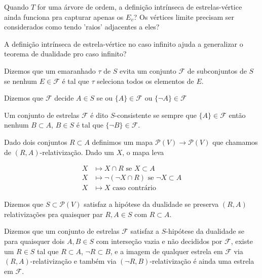 \begin{pergunta}
Quando $T$ for uma árvore de ordem, a definição intrínseca de estrelas-vértice ainda funciona pra capturar apenas os $E_v$? Os vértices limite precisam ser considerados como tendo 'raios' adjacentes a eles?
\end{pergunta}

\begin{pergunta}
 A definição intrínseca de estrela-vértice no caso infinito ajuda a generalizar o teorema de dualidade pro caso infinito?
 \end{pergunta}

\begin{definicao*}[Evitar]
  Dizemos que um emaranhado $\tau$ de $S$ evita um conjunto $\mathcal{F}$ de subconjuntos de $S$ se nenhum $E \in \mathcal{F}$ é tal que $\tau$ seleciona todos os elementos de $E$.
\end{definicao*}


\begin{definicao*}
  Dizemos que $\mathcal{F}$ decide $A \in S$ se ou $\{A\} \in \mathcal{F}$ ou $\{\lnot A\} \in \mathcal{F}$

  Um conjunto de estrelas $\mathcal{F}$ é dito $S$-consistente se sempre que $\{A\} \in \mathcal{F}$ então nenhum $B \subset A$, $B \in S$ é tal que $\{\lnot B\} \in \mathcal{F}$.
  
  Dado dois conjuntos $R \subset A$ definimos um mapa $\mathcal{P}(V) \rightarrow \mathcal{P}(V)$ que chamamos de $(R,A)$-relativização. Dado um $X$, o mapa leva

  \begin{align*} 
X &\mapsto  X \cap R \text{ se } X \subset A \\ 
X &\mapsto \lnot(\lnot X \cap R) \text{ se } \lnot X \subset A \\
X &\mapsto X \text{ caso contrário}
\end{align*}

  Dizemos que $S \subset \mathcal{P}(V)$ satisfaz a hipótese da dualidade se preserva $(R,A)$ relativizações pra quaisquer par $R,A \in S$ com $R \subset A$.
  
  Dizemos que um conjunto de estrelas $\mathcal{F}$ satisfaz a $S$-hipótese da dualidade se para quaisquer dois $A,B \in S$ com interseção vazia e não decididos por $\mathcal{F}$, existe um $R \in S$ tal que $R \subset A$, $\lnot R \subset B$, e a imagem de qualquer estrela em $\mathcal{F}$ via $(R,A)$-relativização e também via $(\lnot R,B)$-relativização é ainda uma estrela em $\mathcal{F}$.
\end{definicao*}



